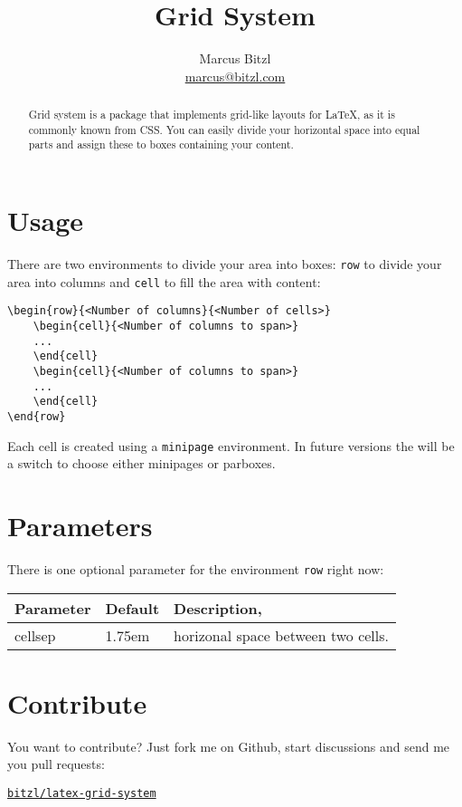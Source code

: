 \documentclass[DIV13]{scrartcl}
\title{Grid System}
\author{Marcus Bitzl\\ \url{marcus@bitzl.com}}
\begin{document}
\maketitle

\begin{abstract}
Grid system is a package that implements grid-like layouts for \LaTeX, as it is commonly known from CSS. You can easily divide your horizontal space into equal parts and assign these to boxes containing your content.
\end{abstract}

\section{Usage}
There are two environments to divide your area into boxes: \texttt{row} to divide your area into columns and \texttt{cell} to fill the area with content:

\medskip

\begin{lstlisting}
\begin{row}{<Number of columns}{<Number of cells>}
	\begin{cell}{<Number of columns to span>}
	...
	\end{cell}
	\begin{cell}{<Number of columns to span>}
	...
	\end{cell}
\end{row}
\end{lstlisting}

Each cell is created using a \texttt{minipage} environment. In future versions the will be a switch to choose either minipages or parboxes.

\section{Parameters}
There is one optional parameter for the environment \texttt{row} right now:

\medskip

\begin{tabularx}{\linewidth}{llX}\toprule
\textbf{Parameter} & \textbf{Default} & \textbf{Description},\\ \midrule
cellsep & 1.75em & horizonal space between two cells.\\\bottomrule
\end{tabularx}

\section{Contribute}
You want to contribute? Just fork me on Github, start discussions and send me you pull requests: 
\begin{center}
	\href{https://github.com/bitzl/latex-grid-system}{\tt bitzl/latex-grid-system}
\end{center}
	
\end{document}
